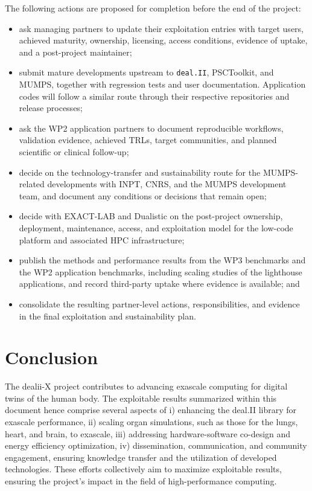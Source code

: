\documentclass[a4paper,12pt]{article}
\begin{document}
The following actions are proposed for completion before the end of the
project:
\begin{itemize}
  \item ask managing partners to update their exploitation entries with target
  users, achieved maturity, ownership, licensing, access conditions,
  evidence of uptake, and a post-project maintainer;
  \item submit mature developments upstream to \texttt{deal.II}, PSCToolkit,
  and MUMPS, together with regression tests
  and user documentation. Application codes will follow a similar route
  through their respective repositories and release processes;
  \item ask the WP2 application partners to document reproducible
  workflows, validation evidence, achieved TRLs, target communities, and
  planned scientific or clinical follow-up;
  \item decide on the technology-transfer and sustainability route for the
  MUMPS-related developments with INPT, CNRS, and the MUMPS development
  team, and document any conditions or decisions that remain open;
  \item decide with EXACT-LAB and Dualistic on the post-project ownership,
  deployment, maintenance, access, and exploitation model for the low-code
  platform and associated HPC infrastructure;
  \item publish the methods and performance results from the WP3 benchmarks
  and the WP2 application benchmarks, including scaling studies of the
  lighthouse applications, and record third-party uptake where evidence is
  available; and
  \item consolidate the resulting partner-level actions, responsibilities, and
  evidence in the final exploitation and sustainability plan.
\end{itemize}

\section{{Conclusion}} \label{sec:conclusion}

The dealii-X project contributes to advancing exascale computing for digital twins of the human body. The exploitable results summarized within this document hence comprise several aspects of i) enhancing the deal.II library for exascale performance, ii) scaling organ simulations, such as those for the lungs, heart, and brain, to exascale, iii) addressing hardware-software co-design and energy efficiency optimization, iv) dissemination, communication, and community engagement, ensuring knowledge transfer and the utilization of developed technologies. These efforts collectively aim to maximize exploitable results, ensuring the project’s impact in the field of high-performance computing.

\label{MyLastPage}
\end{document}
